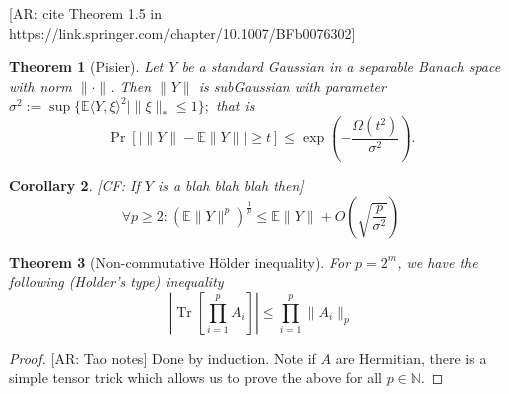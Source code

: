 \documentclass{article}
\newtheorem{theorem}{Theorem}
\newtheorem{corollary}[theorem]{Corollary}
\newcommand{\E}{\mathbb{E}}
\newcommand\tr{\operatorname{Tr}}
\newcommand{\CF}[1]{{\color{purple}[CF: #1]}}
\newcommand{\AR}[1]{{\color{orange}[AR: #1]}}
\begin{document}
%
\AR{cite Theorem 1.5 in https://link.springer.com/chapter/10.1007/BFb0076302}
\begin{theorem} [Pisier]
Let $Y$ be a standard Gaussian in a separable Banach space with norm $\|\cdot\|$. Then $\|Y\|$ is subGaussian with parameter $\sigma^{2} := \sup \{ \E \langle Y, \xi \rangle^{2} \mid \|\xi\|_{*} \leq 1 \}; $ that is
\[ \Pr [ | \|Y\| - \E \|Y\| | \geq t ] \leq \exp \left( - \frac{\Omega(t^{2})}{\sigma^{2}} \right).   \]
\end{theorem}

\begin{corollary}\CF{If $Y$ is a blah blah blah then}
\[ \forall p \geq 2: (\E \|Y\|^{p})^{\frac{1}{p}} \leq \E \|Y\| + O \left( \sqrt{\frac{p}{\sigma^{2}}} \right)   \]
\end{corollary}

\begin{theorem}[Non-commutative H\"older inequality]\label{thm:holder}
For $p = 2^{m}$, we have the following (Holder's type) inequality
\[ |\tr[\prod_{i=1}^{p} A_{i}]| \leq \prod_{i=1}^{p} \|A_{i}\|_{p}   \]
\end{theorem}
\begin{proof}
\AR{Tao notes} Done by induction. Note if $A$ are Hermitian, there is a simple tensor trick which allows us to prove the above for all $p \in \mathbb{N}$.
\end{proof}
\end{document}
